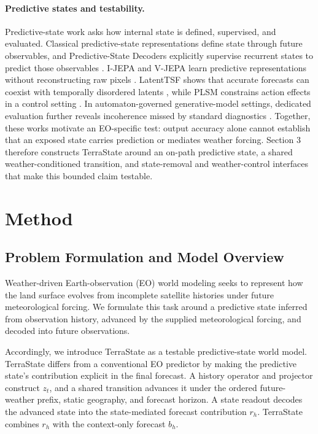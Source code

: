 \documentclass[letterpaper]{article} %
\begin{document}
\paragraph{Predictive states and testability.}
Predictive-state work asks how internal state is defined, supervised, and
evaluated. Classical predictive-state representations define state through
future observables, and Predictive-State Decoders explicitly supervise
recurrent states to predict those observables
\cite{littman2001predictive,venkatraman2017predictivestate}. I-JEPA and V-JEPA
learn predictive representations without reconstructing raw pixels
\cite{assran2023ijepa,bardes2024vjepa}. LatentTSF shows that accurate forecasts
can coexist with temporally disordered latents \cite{yang2026latenttsf}, while
PLSM constrains action effects in a control setting \cite{saanum2024simplifying}.
In automaton-governed generative-model settings, dedicated evaluation further
reveals incoherence missed by standard diagnostics \cite{vafa2024evaluating}.
Together, these works motivate an EO-specific test: output accuracy alone
cannot establish that an exposed state carries prediction or mediates weather
forcing. Section 3 therefore constructs TerraState around an on-path predictive
state, a shared weather-conditioned transition, and state-removal and
weather-control interfaces that make this bounded claim testable.

\section{Method}

\subsection{Problem Formulation and Model Overview}

Weather-driven Earth-observation (EO) world modeling seeks to represent how
the land surface evolves from incomplete satellite histories under future
meteorological forcing. We formulate this task around a predictive state
inferred from observation history, advanced by the supplied meteorological
forcing, and decoded into future observations.

Accordingly, we introduce TerraState as a testable predictive-state world
model. TerraState differs from a conventional EO predictor by making the
predictive state's contribution explicit in the final forecast. A history
operator and projector construct $z_t$, and a shared transition advances it
under the ordered future-weather prefix, static geography, and forecast
horizon. A state readout decodes the advanced state into the state-mediated
forecast contribution $r_h$. TerraState combines $r_h$ with the context-only
forecast $b_h$.
\end{document}
